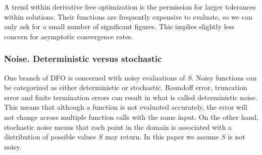 \documentclass{article}
\begin{document}
A trend within derivative free optimization is the permission for larger tolerances within solutions.
Their functions are frequently expensive to evaluate, so we can only ask for a small number of significant figures.
This implies slightly less concern for asymptotic convergence rates.



%
%
%

\subsubsection{Noise. Deterministic versus stochastic}

One branch of DFO is concerned with noisy evaluations of $S$.
Noisy functions can be categorized as either deterministic or stochastic.
Roundoff error, truncation error and finite termination errors can result in what is called deterministic noise.
This means that although a function is not evaluated accurately, the error will not change across multiple function calls with the same input.
On the other hand, stochastic noise means that each point in the domain is associated with a distribution of possible values $S$ may return.
In this paper we assume $S$ is not noisy.
\end{document}
